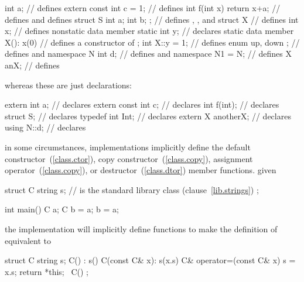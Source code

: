 %
\begin{codeblock}
int a;                          // defines 
extern const int c = 1;         // defines 
int f(int x) { return x+a; }    // defines  and defines 
struct S { int a; int b; };     // defines , , and 
struct X {                      // defines 
    int x;                      // defines nonstatic data member 
    static int y;               // declares static data member 
    X(): x(0) { }               // defines a constructor of 
};
int X::y = 1;                   // defines 
enum { up, down };              // defines  and 
namespace N { int d; }          // defines  and 
namespace N1 = N;               // defines 
X anX;                          // defines 

\end{codeblock}
whereas these are just declarations:
%
\begin{codeblock}
extern int a;                   // declares 
extern const int c;             // declares 
int f(int);                     // declares 
struct S;                       // declares 
typedef int Int;                // declares 
extern X anotherX;              // declares 
using N::d;                     // declares 
\end{codeblock}
\exitexampleb

\pnum
\enternote 
{}%
in some circumstances, \Cpp implementations implicitly define the
default constructor~(\ref{class.ctor}),
copy constructor~(\ref{class.copy}),
assignment operator~(\ref{class.copy}),
or destructor~(\ref{class.dtor}) member functions.
\enterexample given

\begin{codeblock}
struct C {
    string s;                   //  is the standard library class (clause~\ref{lib.strings})
};

int main()
{
    C a;
    C b = a;
    b = a;
}
\end{codeblock}

the implementation will implicitly define functions to make the
definition of  equivalent to

\begin{codeblock}
struct C {
    string s;
    C() : s() { }
    C(const C& x): s(x.s) { }
    C& operator=(const C& x) { s = x.s; return *this; }
    ~C() { }
};
\end{codeblock}
\exitexampleb
\exitnoteb

